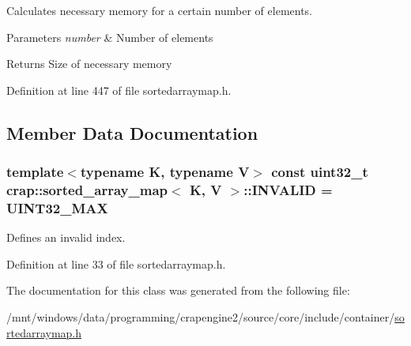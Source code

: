 Calculates necessary memory for a certain number of elements. 


\begin{DoxyParams}{Parameters}
{\em number} & Number of elements \\
\hline
\end{DoxyParams}
\begin{DoxyReturn}{Returns}
Size of necessary memory 
\end{DoxyReturn}


Definition at line 447 of file sortedarraymap.\+h.



\subsection{Member Data Documentation}
\hypertarget{classcrap_1_1sorted__array__map_a06a093e7319d7e543f47fbb5e0635a3a}{
\subsubsection[{I\+N\+V\+A\+L\+I\+D}]{\setlength{\rightskip}{0pt plus 5cm}template$<$typename K, typename V$>$ const uint32\+\_\+t {\bf crap\+::sorted\+\_\+array\+\_\+map}$<$ K, V $>$\+::I\+N\+V\+A\+L\+I\+D = {\bf U\+I\+N\+T32\+\_\+\+M\+A\+X}\hspace{0.3cm}{\ttfamily [static]}}}\label{classcrap_1_1sorted__array__map_a06a093e7319d7e543f47fbb5e0635a3a}


Defines an invalid index. 



Definition at line 33 of file sortedarraymap.\+h.



The documentation for this class was generated from the following file\+:\begin{DoxyCompactItemize}
\item 
/mnt/windows/data/programming/crapengine2/source/core/include/container/\hyperlink{sortedarraymap_8h}{sortedarraymap.\+h}\end{DoxyCompactItemize}
